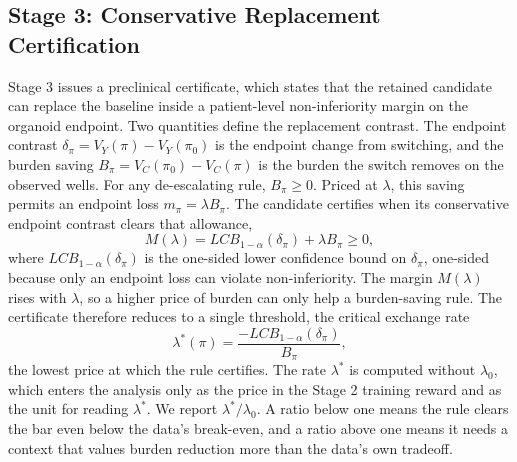 \documentclass[conference]{IEEEtran}
\begin{document}
\subsection{Stage 3: Conservative Replacement Certification}

Stage 3 issues a preclinical certificate, which states that the retained candidate can replace the baseline inside a patient-level non-inferiority margin on the organoid endpoint. Two quantities define the replacement contrast. The endpoint contrast \(\delta_\pi=V_Y(\pi)-V_Y(\pi_0)\) is the endpoint change from switching, and the burden saving \(B_\pi=V_C(\pi_0)-V_C(\pi)\) is the burden the switch removes on the observed wells. For any de-escalating rule, \(B_\pi\ge 0\). Priced at \(\lambda\), this saving permits an endpoint loss \(m_\pi=\lambda B_\pi\). The candidate certifies when its conservative endpoint contrast clears that allowance,
\begin{equation}
M(\lambda)=LCB_{1-\alpha}(\delta_\pi)+\lambda B_\pi\ge 0,
\end{equation}
where \(LCB_{1-\alpha}(\delta_\pi)\) is the one-sided lower confidence bound on \(\delta_\pi\), one-sided because only an endpoint loss can violate non-inferiority. The margin \(M(\lambda)\) rises with \(\lambda\), so a higher price of burden can only help a burden-saving rule. The certificate therefore reduces to a single threshold, the critical exchange rate
\begin{equation}
\lambda^\ast(\pi)=\frac{-LCB_{1-\alpha}(\delta_\pi)}{B_\pi},
\end{equation}
the lowest price at which the rule certifies. The rate \(\lambda^\ast\) is computed without \(\lambda_0\), which enters the analysis only as the price in the Stage 2 training reward and as the unit for reading \(\lambda^\ast\). We report \(\lambda^\ast/\lambda_0\). A ratio below one means the rule clears the bar even below the data's break-even, and a ratio above one means it needs a context that values burden reduction more than the data's own tradeoff.
\end{document}
